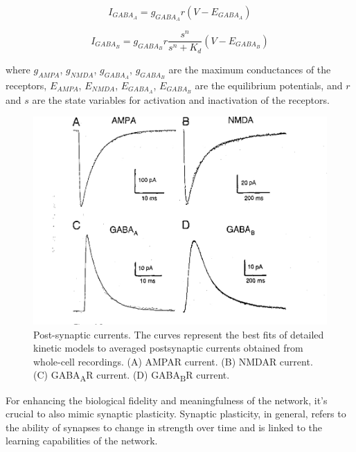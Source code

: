 \begin{equation}
I_{GABA_{A}} = g_{GABA_{A}} r (V-E_{GABA_{A}})
\label{eq:GABAAR Synaptic Current}
\end{equation}

\begin{equation}
I_{GABA_{B}} = g_{GABA_{B}} r \frac{s^{n}}{s^{n}+K_{d}}(V-E_{GABA_{B}})
\label{eq:GABABR Synaptic Current}
\end{equation}

where $g_{AMPA}$, $g_{NMDA}$, $g_{GABA_{A}}$, $g_{GABA_{B}}$ are the maximum conductances of the receptors, $E_{AMPA}$, $E_{NMDA}$, $E_{GABA_{A}}$, $E_{GABA_{B}}$ are the equilibrium potentials, and $r$ and $s$ are the state variables for activation and inactivation of the receptors.

\begin{figure}[ht!]
    \begin{center}
    \includegraphics[width=0.9\linewidth]{Figure/Destexhe Synaptic Models.jpg}
    \end{center}
    \caption{\protect\cite{Destexhe1998} Post-synaptic currents. The curves represent the best fits of detailed kinetic models to averaged postsynaptic currents obtained from whole-cell recordings. (A) AMPAR current. (B) NMDAR current. (C) GABA\textsubscript{A}R current. (D) GABA\textsubscript{B}R current.}
    \label{fig:Destexhe Synaptic Models}
\end{figure}

For enhancing the biological fidelity and meaningfulness of the network, it's crucial to also mimic synaptic plasticity. Synaptic plasticity, in general, refers to the ability of synapses to change in strength over time and is linked to the learning capabilities of the network.

